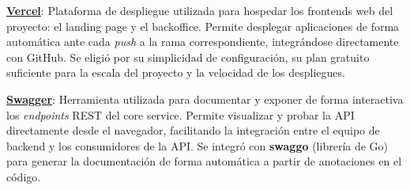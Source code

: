 \vspace{0.25cm}

\textbf{\underline{Vercel}}: Plataforma de despliegue utilizada para hospedar los frontends web del proyecto: el landing page 
y el backoffice. Permite desplegar aplicaciones de forma automática ante cada \textit{push} a la rama correspondiente, 
integrándose directamente con GitHub. Se eligió por su simplicidad de configuración, su plan gratuito suficiente para la 
escala del proyecto y la velocidad de los despliegues.

\vspace{0.25cm}

\textbf{\underline{Swagger}}: Herramienta utilizada para documentar y exponer de forma interactiva los \textit{endpoints} REST 
del core service. Permite visualizar y probar la API directamente desde el navegador, facilitando la integración entre el 
equipo de backend y los consumidores de la API. Se integró con \textbf{swaggo} (librería de Go) para generar la documentación de forma automática 
a partir de anotaciones en el código.

